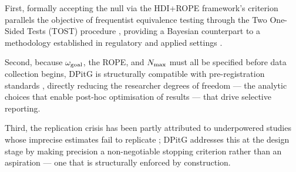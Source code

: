 First, formally accepting the null via the HDI+ROPE framework's criterion parallels the objective
of frequentist equivalence testing through the Two One-Sided Tests (TOST) procedure
\citep{schuirmann1987, lakens2018}, providing a Bayesian counterpart to a methodology
established in regulatory and applied settings \citep{fda2010bayesian}.

Second, because $\omega_{\rm goal}$, the ROPE, and $N_{\rm max}$ must all be specified
before data collection begins, DPitG is structurally compatible with pre-registration
standards \citep{nosek2018}, directly reducing the researcher degrees of freedom ---
the analytic choices that enable post-hoc optimisation of results --- that drive
selective reporting.

Third, the replication crisis has been partly attributed to underpowered studies whose
imprecise estimates fail to replicate \citep{osc2015, gelman2014}; DPitG addresses this
at the design stage by making precision a non-negotiable stopping criterion rather than
an aspiration --- one that is structurally enforced by construction.
